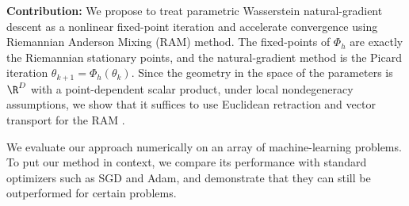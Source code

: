\documentclass{article} %
\numberwithin{equation}{subsection}
\numberwithin{theorem}{section}
\newcommand{\cE}{\mathcal{E}}
\newcommand{\cF}{\mathcal{F}}
\newcommand{\rhoref}{{\rho_{\text{ref}}}}
\newcommand{\rExp}{\operatorname{Exp}}
\begin{document}
    
    \textbf{Contribution:} 
        We propose to treat parametric Wasserstein natural-gradient descent as a nonlinear fixed-point iteration
        and accelerate convergence using Riemannian Anderson Mixing (RAM) method. 
    The fixed-points of $\Phi_h$ are exactly the Riemannian stationary points, and the natural-gradient method is the Picard iteration $\theta_{k+1}=\Phi_h(\theta_k)$. 
    Since the geometry in the space of the parameters is $\R^D$ with a point-dependent scalar product, under local nondegeneracy assumptions, we show that it suffices to use Euclidean retraction and vector transport for the RAM . 

    
    We evaluate our approach numerically on an array of machine-learning problems.
    To put our method in context, we compare its performance with standard optimizers such as SGD and Adam, and demonstrate that they can still be outperformed for certain problems.
\end{document}
